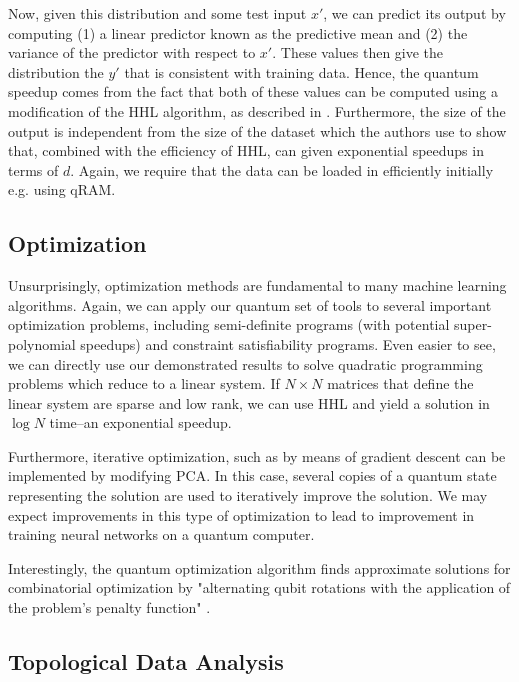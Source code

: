 \documentclass[main.tex]{subfiles}
\begin{document}
Now, given this distribution and some test input $x'$, we can predict its output by computing (1) a linear predictor known as the predictive mean and (2) the variance of the predictor with respect to $x'$. These values then give the distribution the $y'$ that is consistent with training data. Hence, the quantum speedup comes from the fact that both of these values can be computed using a modification of the HHL algorithm, as described in \cite{zhao2018quantum}. Furthermore, the size of the output is independent from the size of the dataset which the authors use to show that, combined with the efficiency of HHL, can given exponential speedups in terms of $d$. Again, we require that the data can be loaded in efficiently initially e.g. using qRAM.  

\subsection{Optimization}

Unsurprisingly, optimization methods are fundamental to many machine learning algorithms. Again, we can apply our quantum set of tools to several important optimization problems, including semi-definite programs (with potential super-polynomial speedups) and constraint satisfiability programs. Even easier to see, we can directly use our demonstrated results to solve quadratic programming problems which reduce to a linear system. If $N \times N$ matrices that define the linear system are sparse and low rank, we can use HHL and yield a solution in $\log N$ time--an exponential speedup.

Furthermore, iterative optimization, such as by means of gradient descent can be implemented by modifying PCA. In this case, several copies of a quantum state representing the solution are used to iteratively improve the solution. We may expect improvements in this type of optimization to lead to improvement in training neural networks on a quantum computer. 

Interestingly, the quantum optimization algorithm finds approximate solutions for combinatorial optimization by "alternating qubit rotations with the application of the problem's penalty function" \cite{biamonte2017quantum}.

\subsection{Topological Data Analysis}
\end{document}
